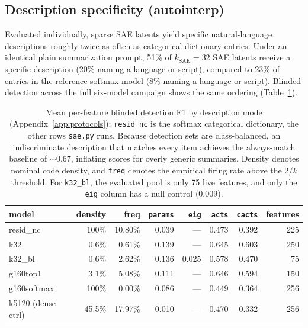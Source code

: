 \subsection{Description specificity (autointerp)}
\label{sec:autointerp}

Evaluated individually, sparse SAE latents yield specific natural-language
descriptions roughly twice as often as categorical dictionary entries.
Under an identical plain summarization prompt, 51\% of
$k_{\mathrm{SAE}}{=}32$ SAE latents receive a specific description (20\%
naming a language or script), compared to 23\% of entries in the
reference softmax model (8\% naming a language or script). Blinded
detection across the full six-model campaign shows the same ordering
(Table~\ref{tab:autointerp}).

\begin{table}[htbp]\centering\small
\begin{tabular}{@{}lrrrrrrr@{}}
\toprule
model & density & freq & \texttt{params} & \texttt{eig} & \texttt{acts} & \texttt{cacts} & features \\
\midrule
resid\_nc          & 100\%  & 10.80\% & 0.039 & ---   & 0.473 & 0.392 & 225 \\
k32                & 0.6\%  & 0.61\%  & 0.139 & ---   & 0.645 & 0.603 & 250 \\
k32\_bl            & 0.6\%  & 2.62\%  & 0.136 & 0.025 & 0.578 & 0.470 & 75 \\
g160top1           & 3.1\%  & 5.08\%  & 0.111 & ---   & 0.646 & 0.594 & 150 \\
g160softmax        & 100\%  & 0.00\%  & 0.086 & ---   & 0.449 & 0.364 & 256 \\
k5120 (dense ctrl) & 45.5\% & 17.97\% & 0.010 & ---   & 0.470 & 0.332 & 256 \\
\bottomrule
\end{tabular}
\caption{Mean per-feature blinded detection F1 by description mode
(Appendix~\ref{app:protocols}); \texttt{resid\_nc} is the softmax
categorical dictionary, the other rows \texttt{sae.py} runs. Because detection sets are class-balanced,
an indiscriminate description that matches every item achieves the
always-match baseline of ${\sim}0.67$, inflating scores for overly generic
summaries. Density denotes nominal code density, and \texttt{freq} denotes
the empirical firing rate above the $2/k$ threshold. For \texttt{k32\_bl},
the evaluated pool is only 75 live features, and only the \texttt{eig}
column has a null control ($0.009$).}
\label{tab:autointerp}
\end{table}

